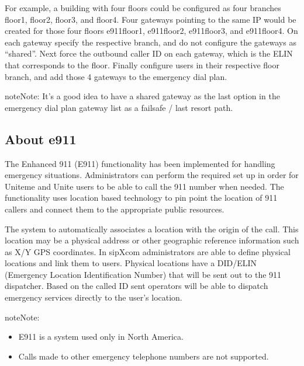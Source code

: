 \documentclass[letterpaper,10pt,english]{sphinxmanual}
\begin{document}
For example, a building with four floors could be configured as four branches \textendash{} floor1, floor2, floor3, and floor4.
Four gateways pointing to the same IP would be created for those four floors \textendash{} e911floor1, e911floor2, e911floor3, and e911floor4.
On each gateway specify the respective branch, and do not configure the gateways as “shared”. Next force the outbound caller ID on each gateway, which is the ELIN that corresponds to the floor.
Finally configure users in their respective floor branch, and add those 4 gateways to the emergency dial plan.

\begin{sphinxadmonition}{note}{Note:}
It’s a good idea to have a shared gateway as the last option in the emergency dial plan gateway list as a failsafe / last resort path.
\end{sphinxadmonition}


\subsection{About e911}
\label{\detokenize{restapi:about-e911}}
The Enhanced 911 (E911) functionality has been implemented for handling emergency situations. Administrators can perform the required set up in order for Uniteme and Unite users to be able to call the 911 number when needed. The functionality uses location based technology to pin point the location of 911 callers and connect them to the appropriate public resources.

The system to automatically associates a location with the origin of the call. This location may be a physical address or other geographic reference information such as X/Y GPS coordinates. In sipXcom administrators are able to define physical locations and link them to users. Physical locations have a DID/ELIN (Emergency Location Identification Number) that will be sent out to the 911 dispatcher. Based on the called ID sent operators will be able to dispatch emergency services directly to the user’s location.

\begin{sphinxadmonition}{note}{Note:}\begin{itemize}
\item {} 
E911 is a system used only in North America.

\item {} 
Calls made to other emergency telephone numbers are not supported.

\end{itemize}
\end{sphinxadmonition}
\end{document}
